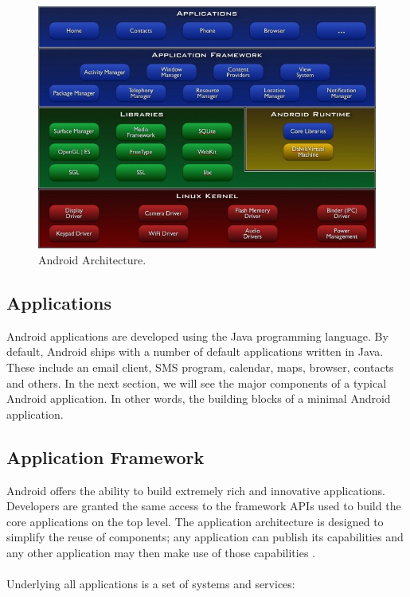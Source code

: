 \begin{figure}[h!]
\centering
\includegraphics[width=1.0\textwidth]{images/chap4_android_architecture.jpg}
\caption{Android Architecture.}
\label{fig:android_architecture}
\end{figure}

\subsection{Applications}

Android applications are developed using the Java programming language. By default, Android ships with a number of default applications written in Java. These include an email client, SMS program, calendar, maps, browser, contacts and others. In the next section, we will see the major components of a typical Android application. In other words, the building blocks of a minimal Android application.

\subsection{Application Framework}

Android offers the ability to build extremely rich and innovative applications. Developers are granted the same access to the framework APIs used to build the core applications on the top level. The application architecture is designed to simplify the reuse of components; any application can publish its capabilities and any other application may then make use of those capabilities \cite{WhatAndroid}. 
\\ \\
Underlying all applications is a set of systems and services:

